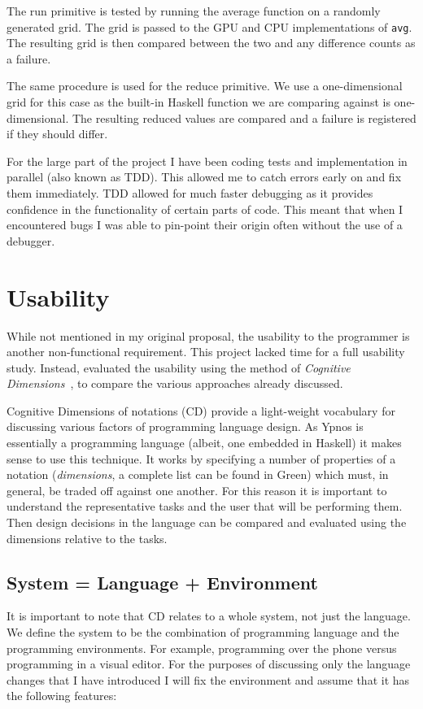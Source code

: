 \documentclass[
    12pt,
    a4paper,
    twoside,
    openright,
    ]{scrbook}
\begin{document}
The run primitive is tested by running the average function on a randomly
generated grid. The grid is passed to the GPU and CPU implementations of
\texttt{avg}. The resulting grid is then compared between the two and any
difference counts as a failure.

The same procedure is used for the reduce primitive. We use a one-dimensional
grid for this case as the built-in Haskell function we are comparing against is
one-dimensional. The resulting reduced values are compared and a failure is
registered if they should differ.

For the large part of the project I have been coding tests and implementation in
parallel (also known as TDD). This allowed me to catch errors early on and fix
them immediately.  TDD allowed for much faster debugging as it provides
confidence in the functionality of certain parts of code. This meant that when I
encountered bugs I was able to pin-point their origin often without the use of a
debugger.

\section{Usability}

While not mentioned in my original proposal, the usability to the programmer is
another non-functional requirement. This project lacked time for a full
usability study. Instead, evaluated the usability using the method of
\emph{Cognitive Dimensions}~\cite{green96}, to compare the various approaches
already discussed.

Cognitive Dimensions of notations (CD) provide a light-weight vocabulary for
discussing various factors of programming language design. As Ypnos is
essentially a programming language (albeit, one embedded in Haskell) it makes
sense to use this technique. It works by specifying a number of properties of a
notation (\emph{dimensions}, a complete list can be found in
Green\cite{green96}) which must, in general, be traded off against one
another. For this reason it is important to understand the representative tasks
and the user that will be performing them. Then design decisions in the language
can be compared and evaluated using the dimensions relative to the tasks.

\subsection{System = Language + Environment}

It is important to note that CD relates to a whole system, not just the
language. We define the system to be the combination of programming language and
the programming environments. For example, programming over the phone versus
programming in a visual editor. For the purposes of discussing only the language
changes that I have introduced I will fix the environment and assume that it has
the following features:
\end{document}
